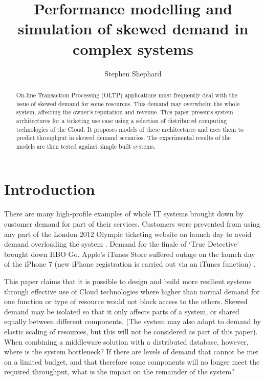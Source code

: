 \documentclass[runningheads]{llncs}
\begin{document}
\title{Performance modelling and simulation of skewed demand in complex systems}

\author{Stephen Shephard}


\maketitle

%
%
\begin{abstract}
On-line Transaction Processing (OLTP) applications must frequently deal with the issue of skewed demand for some resources.  This demand may overwhelm the whole system, affecting the owner's reputation and revenue.  This paper presents system architectures for a ticketing use case using a selection of distributed computing technologies of the Cloud.  It proposes models of these architectures and uses them to predict throughput in skewed demand scenarios.  The experimental results of the models are then tested against simple built systems.
\end{abstract}

%
%

\section{Introduction}\label{sec:introduction}

There are many high-profile examples of whole IT systems brought down by customer demand for part of their services.  Customers were prevented from using any part of the London 2012 Olympic ticketing website on launch day to avoid demand overloading the system \cite{RN1067}.  Demand for the finale of `True Detective' \cite{RN1066} brought down HBO Go.  Apple's iTunes Store suffered outage on the launch day of the iPhone 7 (new iPhone registration is carried out via an iTunes function) \cite{RN1068}.

This paper claims that it is possible to design and build more resilient systems through effective use of Cloud technologies where higher than normal demand for one function or type of resource would not block access to the others.  Skewed demand may be isolated so that it only affects parts of a system, or shared equally between different components. (The system may also adapt to demand by elastic scaling of resources, but this will not be considered as part of this paper).  When combining a middleware solution with a distributed database, however, where is the system bottleneck? If there are levels of demand that cannot be met on a limited budget, and that therefore some components will no longer meet the required throughput, what is the impact on the remainder of the system?
\end{document}
